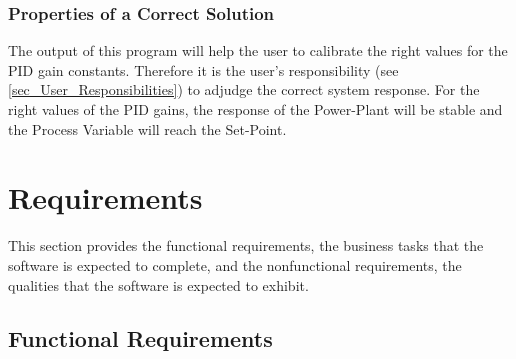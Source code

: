\documentclass[12pt]{article}
\begin{document}
\subsubsection{Properties of a Correct Solution} \label{sec_CorrectSolution}

\noindent
The output of this program will help the user to calibrate the right values for 
the PID gain constants. Therefore it is the user's responsibility (see 
\ref{sec_User_Responsibilities}) to adjudge the correct system response. For the right values of the PID gains, the response of the Power-Plant will be stable and 
the Process Variable will reach the Set-Point.

  


\section{Requirements}


This section provides the functional requirements, the business tasks that the
software is expected to complete, and the nonfunctional requirements, the
qualities that the software is expected to exhibit.

\subsection{Functional Requirements}
\end{document}
